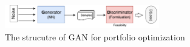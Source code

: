 \documentclass[11pt]{article}
\begin{document}
	
	
	\begin{figure}[h] 
		\begin{center}
			\includegraphics[width=0.6\textwidth]{GAN_port}
			\caption{The strucutre of GAN for portfolio optimization} \label{fig:GAN-port}
		\end{center}
	\end{figure}
	
	
	
	
	
	
	
	
\end{document}
